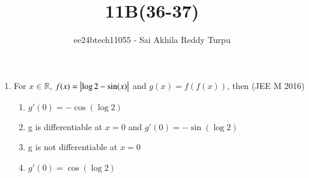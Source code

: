 \documentclass[journal,12pt,twocolumn]{IEEEtran}
\theoremstyle{remark}
\begin{document}

\vspace{3cm}

\title{11B(36-37)}
\author{ee24btech11055 - Sai Akhila Reddy Turpu}
\maketitle
\newpage
\bigskip

\renewcommand{\thefigure}{\theenumi}
\renewcommand{\thetable}{\theenumi}
\begin{enumerate}[start=36]
		


	\item For $x\in\mathbb{R}$, $f(x)=\left\vert\log 2-\sin(x)\right\vert$ and 
	$g(x)=f(f(x))$, then 
	\hfill{(JEE M 2016)}
	\begin{enumerate}
		\item $g'(0) = -\cos(\log 2)$
		\item g is differentiable at $x=0$ and $g'(0) = -\sin(\log 2)$
		\item g is not differentiable at $x=0$
		\item $g'(0) =  \cos(\log 2)$
	\end{enumerate}


\end{enumerate}
\end{document}
